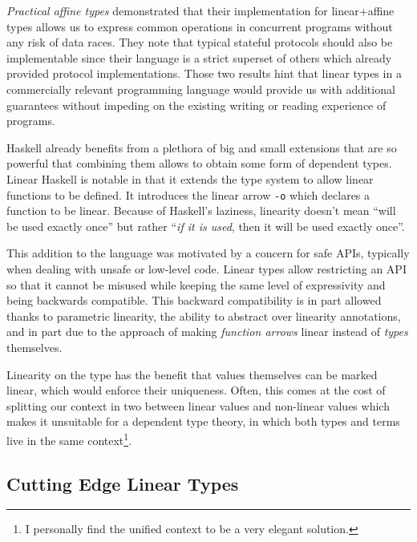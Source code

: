 \documentclass[
]{article}
\begin{document}
\emph{Practical affine types} demonstrated that their implementation for
linear+affine types allows us to express common operations in concurrent
programs without any risk of data races\cite{linear_race}. They note
that typical stateful protocols should also be implementable since their
language is a strict superset of others which already provided protocol
implementations. Those two results hint that linear types in a
commercially relevant programming language would provide us with
additional guarantees without impeding on the existing writing or
reading experience of programs.

Haskell already benefits from a plethora of big and small extensions
that are so powerful that combining them allows to obtain some form of
dependent types\cite{hasochism}. Linear Haskell\cite{linear_haskell} is
notable in that it extends the type system to allow linear functions to
be defined. It introduces the linear arrow \texttt{-o} which declares a
function to be linear. Because of Haskell's laziness, linearity doesn't
mean ``will be used exactly once'' but rather ``\emph{if it is used},
then it will be used exactly once''.

This addition to the language was motivated by a concern for safe APIs,
typically when dealing with unsafe or low-level code. Linear types allow
restricting an API so that it cannot be misused while keeping the same
level of expressivity and being backwards compatible. This backward
compatibility is in part allowed thanks to parametric linearity, the
ability to abstract over linearity annotations, and in part due to the
approach of making \emph{function arrows} linear instead of \emph{types}
themselves.

Linearity on the type has the benefit that values themselves can be
marked linear, which would enforce their uniqueness. Often, this comes
at the cost of splitting our context in
two\cite{lightweight_linear_types} between linear values and non-linear
values which makes it unsuitable for a dependent type theory, in which
both types and terms live in the same context\footnote{I personally find
  the unified context to be a very elegant solution.}.

\hypertarget{cutting-edge-linear-types}{%
\subsection{Cutting Edge Linear Types}\label{cutting-edge-linear-types}}
\end{document}
